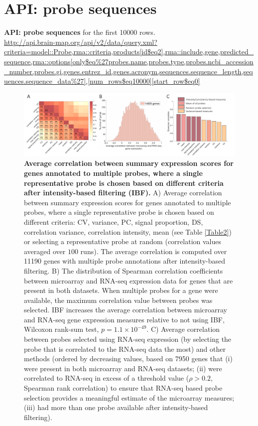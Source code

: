 \section{API: probe sequences}
\label{app:AppendixCh4_7}

\textbf{API: probe sequences} for the first \num{10000} rows.\\
\url{http://api.brain-map.org/api/v2/data/query.xml?criteria=model::Probe,rma::criteria,products[id$eq2],rma::include,gene,predicted_sequence,rma::options[only$eq%27probes.name,probes.type,probes.ncbi_accession_number,probes.gi,genes.entrez_id,genes.acronym,sequences.sequence_length,sequences.sequence_data%27],[num_rows$eq10000][start_row$eq0]}

\newpage

\begin{figure}[h!]
  \centering
    \includegraphics[width=1\textwidth]{Chapter4/FigureS1.pdf}
\caption{\textbf{Average correlation between summary expression scores for genes annotated to multiple probes, where a single representative probe is chosen based on different criteria after intensity-based filtering (IBF).}
A) Average correlation between summary expression scores for genes annotated to multiple probes, where a single representative probe is chosen based on different criteria: CV, variance, PC, signal proportion, DS, correlation variance, correlation intensity, mean (see Table \ref{Table2}) or selecting a representative probe at random (correlation values averaged over $100$ runs). The average correlation is computed over \num{11190} genes with multiple probe annotations after intensity-based filtering. B) The distribution of Spearman correlation coefficients between microarray and RNA-seq expression data for genes that are present in both datasets. When multiple probes for a gene were available, the maximum correlation value between probes was selected. IBF increases the average correlation between microarray and RNA-seq gene expression measures relative to not using IBF, Wilcoxon rank-sum test, $p=1.1 \times 10^{-49}$. C) Average correlation between probes selected using RNA-seq expression (by selecting the probe that is correlated to the RNA-seq data the most) and other methods (ordered by decreasing values, based on \num{7950} genes that (i) were present in both microarray and RNA-seq datasets; (ii) were correlated to RNA-seq in excess of a threshold value ($\rho > 0.2$, Spearman rank correlation) to ensure that RNA-seq based probe selection provides a meaningful estimate of the microarray measures; (iii) had more than one probe available after intensity-based filtering). }
\label{fig:Ch4Sfig1}
\end{figure}

